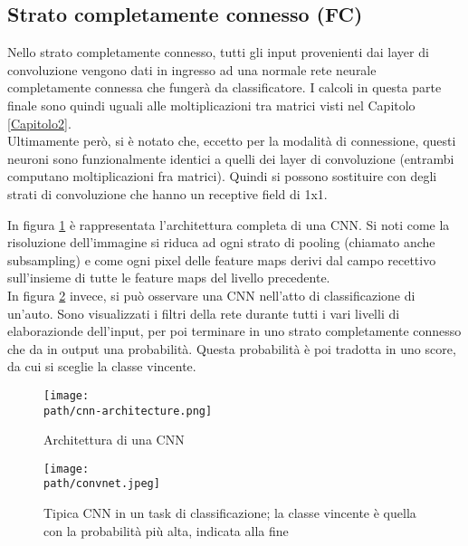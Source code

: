\subsection{Strato completamente connesso (FC)}
Nello strato completamente connesso, tutti gli input provenienti dai layer di convoluzione vengono dati in ingresso ad una normale rete neurale completamente connessa che fungerà da classificatore. I calcoli in questa parte finale sono quindi uguali alle moltiplicazioni tra matrici visti nel Capitolo \ref{Capitolo2}. \\
Ultimamente però, si è notato che, eccetto per la modalità di connessione, questi neuroni sono funzionalmente identici a quelli dei layer di convoluzione (entrambi computano moltiplicazioni fra matrici). Quindi si possono sostituire con degli strati di convoluzione che hanno un receptive field di 1x1\parencite{WCS231layer}. 

In figura \ref{fig:cnn4} è rappresentata l'architettura completa di una CNN. Si noti come la risoluzione dell'immagine si riduca ad ogni strato di pooling (chiamato anche subsampling) e come ogni pixel delle feature maps derivi dal campo recettivo sull'insieme di tutte le feature maps del livello precedente. \\
In figura \ref{fig:cnn3} invece, si può osservare una CNN nell'atto di classificazione di un'auto. Sono visualizzati i filtri della rete durante tutti i vari livelli di elaborazionde dell'input, per poi terminare in uno strato completamente connesso che da in output una probabilità. Questa probabilità è poi tradotta in uno score, da cui si sceglie la classe vincente. 
\begin{figure}[h!]
 \centering
 \texttt{[image: \\path/cnn-architecture.png]} 
 \caption{Architettura di una CNN}
 \label{fig:cnn4}
\end{figure}

\begin{figure}[h!]
 \centering
 \texttt{[image: \\path/convnet.jpeg]} 
 \caption{Tipica CNN in un task di classificazione; la classe vincente è quella con la probabilità più alta, indicata alla fine}
 \label{fig:cnn3}
\end{figure}

